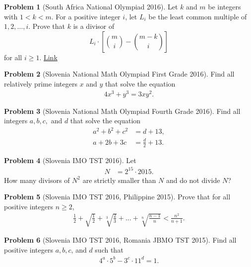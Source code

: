 \documentclass[]{article}
\theoremstyle{definition}
\newtheorem{problem}{Problem}
\begin{document}
\begin{problem}[South Africa National Olympiad 2016]
	Let $k$ and $m$ be integers with $1 < k < m$. For a positive integer $i$, let $L_i$ be the least common multiple of $1,2,\ldots,i$.
	Prove that $k$ is a divisor of $$L_i \cdot \left[\binom{m}{i} - \binom{m-k}{i}\right]$$ for all $i \geq 1$. \hfill \href{http://artofproblemsolving.com/community/c6h1310094p7016426}{Link}
\end{problem}


\begin{problem}[Slovenia National Math Olympiad First Grade 2016]
	Find all relatively prime integers $x$ and $y$ that solve the equation
		\begin{align*}
			4x^3 + y^3 = 3xy^2.
		\end{align*}
\end{problem}


\begin{problem}[Slovenia National Math Olympiad Fourth Grade 2016]
	Find all integers $a,b,c,$ and $d$ that solve the equation
		\begin{align*}
			a^2 + b^2 + c^2 &= d + 13,\\
			a + 2b + 3c &= \frac{d}{2}+ 13.
		\end{align*}
\end{problem}



\begin{problem}[Slovenia IMO TST 2016]
	Let
		\begin{align*}
			N &= 2^{15} \cdot 2015.
		\end{align*}
	How many divisors of $N^2$ are strictly smaller than $N$ and do not divide $N$?
\end{problem}



\begin{problem}[Slovenia IMO TST 2016, Philippine 2015]
	Prove that for all positive integers $n \geq 2$,
		\begin{align*}
			\frac{1}{2} + \sqrt{\frac{1}{2}}+ \sqrt[3]{\frac{2}{3}}+ \dots + \sqrt[n]{\frac{n-1}{n}} < \frac{n^2}{n+1}.
		\end{align*}
\end{problem}



\begin{problem}[Slovenia IMO TST 2016, Romania JBMO TST 2015]
	Find all positive integers $a, b, c$, and $d$ such that
		\begin{align*}
				4^a \cdot 5^b - 3^c \cdot 11^d = 1.
		\end{align*}
\end{problem}
\end{document}
